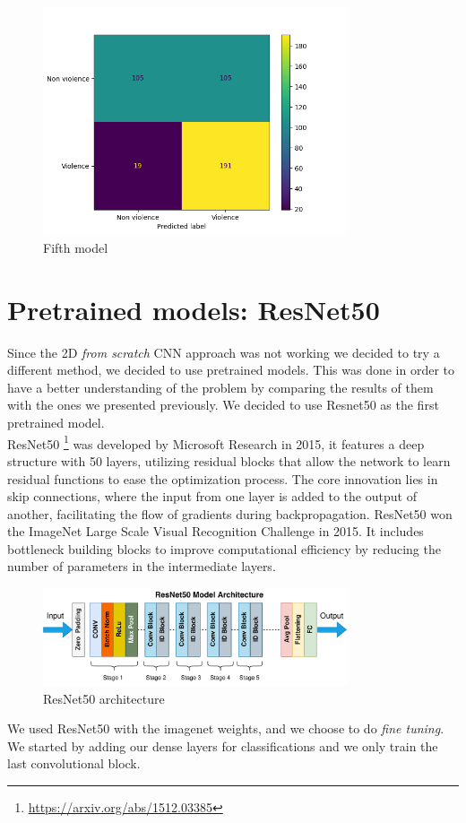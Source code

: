 \begin{figure}[]
    \centering
    \includegraphics[width=0.8\textwidth]{images/731a-2D10_inv-86ad-conf_matrix.png}
    \caption{Fifth model}
    \label{fig:FifthModelConfMatrix}
\end{figure}

\section{Pretrained models: ResNet50}
Since the 2D \textit{from scratch} CNN approach was not working we decided to try a different method, we decided to use pretrained models. This was done in order to have a better understanding of the problem by comparing the results of them with the ones we presented previously. We decided to use Resnet50 as the first pretrained model. \\

ResNet50 \footnote{\url{https://arxiv.org/abs/1512.03385}} was developed by Microsoft Research in 2015, it features a deep structure with 50 layers, utilizing residual blocks that allow the network to learn residual functions to ease the optimization process.
The core innovation lies in skip connections, where the input from one layer is added to the output of another, facilitating the flow of gradients during backpropagation.
ResNet50  won the ImageNet Large Scale Visual Recognition Challenge in 2015. It includes bottleneck building blocks to improve computational efficiency by reducing the number of parameters in the intermediate layers.
\begin{figure}[]
    \centering
    \includegraphics[width=0.8\textwidth]{images/ResNet50_architecture.png}
    \caption{ResNet50 architecture}
    \label{fig:ResNet50Arch}
\end{figure}
We used ResNet50 with the imagenet weights, and we choose to do 
\textit{fine tuning}. We started by adding our dense layers for classifications and we only train the last convolutional block.  

